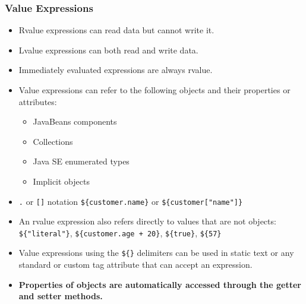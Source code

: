 \documentclass[10pt,xcolor=pdflatex]{beamer}
\begin{document}
\begin{frame}[containsverbatim]\frametitle{Value Expressions}
	\begin{itemize}
    	\item Rvalue expressions can read data but cannot write it.
		\item Lvalue expressions can both read and write data.
        \item Immediately evaluated expressions are always rvalue.
		\item Value expressions can refer to the following objects and their properties or attributes:
          \begin{itemize}
        	\item JavaBeans components
			\item Collections
			\item Java SE enumerated types
			\item Implicit objects
          \end{itemize}
      	\item \verb;.; or \verb;[]; notation \verb;${customer.name}; or \verb;${customer["name"]};
		\item An rvalue expression also refers directly to values that are not objects: \verb;${"literal"};, \verb;${customer.age + 20};, \verb;${true};, \verb;${57};
		\item Value expressions using the \verb;${}; delimiters can be used in static text or any standard or custom tag attribute that can accept an expression.
        \item \textbf{Properties of objects are automatically accessed through the getter and setter methods.}
    \end{itemize}
\end{frame}
\end{document}
